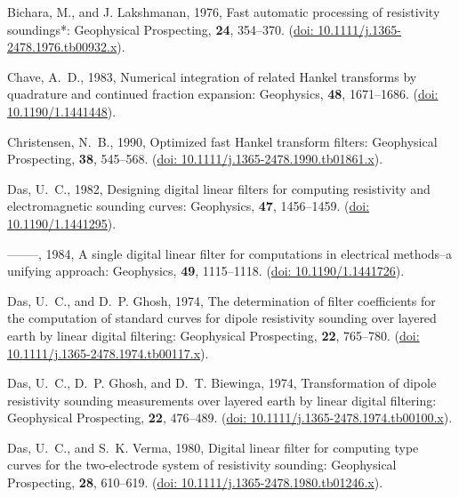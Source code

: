 \documentclass[paper,twocolumn,twoside]{geophysics}
\begin{document}
\begin{thebibliography}{}
Bichara, M., and J. Lakshmanan,  1976, Fast automatic processing of resistivity
  soundings*: Geophysical Prospecting, {\bf 24}, 354--370.
\newblock (\href{http://doi.org/10.1111/j.1365-2478.1976.tb00932.x}{doi:
  10.1111/j.1365-2478.1976.tb00932.x}).

Chave, A.~D.,  1983, Numerical integration of related {H}ankel transforms by
  quadrature and continued fraction expansion: Geophysics, {\bf 48},
  1671--1686.
\newblock (\href{http://doi.org/10.1190/1.1441448}{doi: 10.1190/1.1441448}).

Christensen, N.~B.,  1990, Optimized fast {H}ankel transform filters:
  Geophysical Prospecting, {\bf 38}, 545--568.
\newblock (\href{http://doi.org/10.1111/j.1365-2478.1990.tb01861.x}{doi:
  10.1111/j.1365-2478.1990.tb01861.x}).

Das, U.~C.,  1982, Designing digital linear filters for computing resistivity
  and electromagnetic sounding curves: Geophysics, {\bf 47}, 1456--1459.
\newblock (\href{https://doi.org/10.1190/1.1441295}{doi: 10.1190/1.1441295}).

--------, 1984, A single digital linear filter for computations in electrical
  methods--a unifying approach: Geophysics, {\bf 49}, 1115--1118.
\newblock (\href{https://doi.org/10.1190/1.1441726}{doi: 10.1190/1.1441726}).

Das, U.~C., and D.~P. Ghosh,  1974, The determination of filter coefficients
  for the computation of standard curves for dipole resistivity sounding over
  layered earth by linear digital filtering: Geophysical Prospecting, {\bf 22},
  765--780.
\newblock (\href{http://doi.org/10.1111/j.1365-2478.1974.tb00117.x}{doi:
  10.1111/j.1365-2478.1974.tb00117.x}).

Das, U.~C., D.~P. Ghosh, and D.~T. Biewinga,  1974, Transformation of dipole
  resistivity sounding measurements over layered earth by linear digital
  filtering: Geophysical Prospecting, {\bf 22}, 476--489.
\newblock (\href{http://doi.org/10.1111/j.1365-2478.1974.tb00100.x}{doi:
  10.1111/j.1365-2478.1974.tb00100.x}).

Das, U.~C., and S.~K. Verma,  1980, Digital linear filter for computing type
  curves for the two-electrode system of resistivity sounding: Geophysical
  Prospecting, {\bf 28}, 610--619.
\newblock (\href{http://doi.org/10.1111/j.1365-2478.1980.tb01246.x}{doi:
  10.1111/j.1365-2478.1980.tb01246.x}).


\end{thebibliography}
\end{document}
